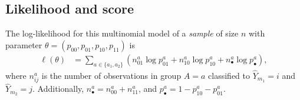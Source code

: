 \documentclass[11pt, sigconf, svgnames]{acmart}
\newcommand{\maxtxt}[1]{\textcolor{blue}{#1}}
\newcommand{\Lc}{\mathcal{L}}
\begin{document}
\subsection*{Likelihood and score}

The log-likelihood for this multinomial model of a \emph{sample} of size $n$
with parameter $\theta = (p_{00}, p_{01}, p_{10}, p_{11})$ is 
 \begin{align*}
   \ell(\theta)   &= \sum_{a\in\{a_1,a_2\}} \left(n_{01}^a \log p_{01}^a +
   n_{10}^a\log p_{10}^a + n_\bullet^a\log p_\bullet^a\right),
 \end{align*}
 where $n_{ij}^a$ is the number of observations in group $A=a$
 classified to $\hat{Y}_{m_1} = i$ and $\hat{Y}_{m_2}=j$.  Additionally, 
 $n_\bullet^a = n_{00}^a + n_{11}^a$, and $p_\bullet^a = 1-p_{10}^a - p_{01}^a$.
 
\end{document}
